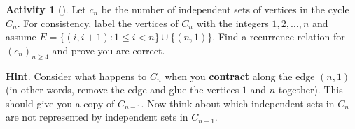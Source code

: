 \documentclass[10pt,]{book}
\newcommand{\terminology}[1]{\textbf{#1}}
\theoremstyle{plain}
\theoremstyle{definition}
\theoremstyle{definition}
\theoremstyle{definition}
\newtheorem{activity}[project]{Activity}
\numberwithin{equation}{chapter}
\def\st{:}
\newcommand{\lt}{<}
\begin{document}
\begin{activity}[]\label{activity-133}
\hypertarget{p-913}{}%
Let \(c_n\) be the number of independent sets of vertices in the cycle \(C_n\).  For consistency, label the vertices of \(C_n\) with the integers \(1, 2, \ldots, n\) and assume \(E = \{(i, i+1) \st 1 \le i \lt n\} \cup \{(n, 1)\}\). Find a recurrence relation for \((c_n)_{n\ge 4}\) and prove you are correct.%
\par\smallskip%
\noindent\textbf{Hint}.\hypertarget{hint-99}{}\quad%
\hypertarget{p-914}{}%
Consider what happens to \(C_n\) when you \terminology{contract} along the edge \((n,1)\) (in other words, remove the edge and glue the vertices \(1\) and \(n\) together).  This should give you a copy of \(C_{n-1}\).  Now think about which independent sets in \(C_n\) are not represented by independent sets in \(C_{n-1}\).%
\end{activity}
\end{document}
